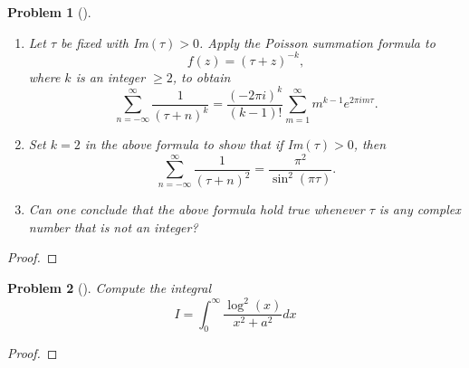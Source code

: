 \documentclass[10pt]{article}
\newcommand{\sk}{\vskip 10mm}
\theoremstyle{plain}
\newtheorem{problem}{Problem}
\theoremstyle{remark}
\begin{document}
\begin{problem}[]
  \begin{enumerate}
  \item[(a)] Let $\tau$ be fixed with Im$(\tau)>0$. Apply the Poisson summation
    formula to
    \[
      f(z) = (\tau + z)^{-k},
    \]
    where $k$ is an integer $\geq 2$, to obtain
    \[
      \sum_{n = -\infty}^\infty
      \frac{1}{(\tau +n)^k} = \frac{(-2\pi i )^k}{(k-1)!} \sum_{m=1}^{\infty} m^{k-1}e^{2\pi im\tau}.
    \]
  \item[(b)] Set $k=2$ in the above formula to show that if Im$(\tau)>0$, then 
    \[
      \sum_{n = -\infty}^\infty 
      \frac{1}{(\tau +n)^2} = \frac{\pi^2}{\sin^2(\pi\tau)}.
    \]
  \item[(c)] Can one conclude that the above formula hold true whenever $\tau$
    is any complex number that is not an integer?
  \end{enumerate}
\end{problem}

\begin{proof}
  
\end{proof}

\sk

\begin{problem}[]
  Compute the integral 
  \[
    I = \int_0^\infty \frac{\log^2(x)}{x^2 + a^2} dx
  \]
\end{problem}

\begin{proof}
  
\end{proof}

\end{document}
